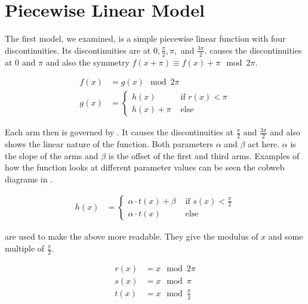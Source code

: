 \section{Piecewise Linear Model}


The first model, we examined, is a simple piecewise linear function with four discontinuities.
Its discontinuities are at $0, \frac{\pi}{2}, \pi,$ and $\frac{3 \pi}{2}$.
 causes the discontinuities at $0$ and $\pi$ and also the symmetry $f(x + \pi) \equiv f(x) + \pi \mod 2 \pi$.

\begin{align}
    f(x) & = g(x) \mod 2 \pi \label{equ:pcw.lin.f} \\
    g(x) & = \begin{cases}
        h(x) & \text{ if } r(x) < \pi \\
        h(x) + \pi & \text{ else}
    \end{cases} \label{equ:pcw.lin.sympi}
\end{align}

Each arm then is governed by .
It causes the discontinuities at $\frac{\pi}{2}$ and $\frac{3 \pi}{2}$ and also shows the linear nature of the function.
Both parameters $\alpha$ and $\beta$ act here.
$\alpha$ is the slope of the arms and $\beta$ is the offset of the first and third arms.
Examples of how the function looks at different parameter values can be seen the cobweb diagrams in .

\begin{align}
    h(x) & = \begin{cases}
        \alpha \cdot t(x) + \beta & \text{ if } s(x) < \frac{\pi}{2} \\
        \alpha \cdot t(x) & \text{ else}
    \end{cases} \label{equ:pcw.lin.discpihalves}
\end{align}

 are used to make the above more readable.
They give the modulus of $x$ and some multiple of $\frac{\pi}{2}$.

\begin{align}
    r(x) & = x \mod 2 \pi \label{equ:pcw.lin.r} \\
    s(x) & = x \mod \pi \\
    t(x) & = x \mod \frac{\pi}{2} \label{equ:pcw.lin.t}
\end{align}





